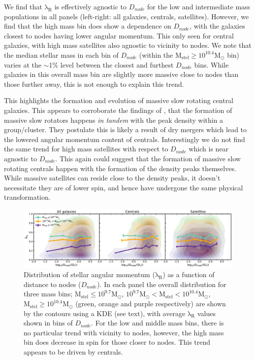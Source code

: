 We find that $\mathrm{\lambda_R}$ is effectively agnostic to $D_{node}$ for the low and intermediate mass populations in all panels (left-right: all galaxies, centrals, satellites). However, we find that the high mass bin does show a dependence on $D_{node}$, with the galaxies closest to nodes having lower angular momentum. This only seen for central galaxies, with high mass satellites also agnostic to vicinity to nodes. We note that the median stellar mass in each bin of $D_{node}$ (within the $\mathrm{M_{stel} \geq 10^{10.4}M_{\odot}}$ bin) varies at the $\sim$1\% level between the closest and furthest $D_{node}$ bins. While galaxies in this overall mass bin are slightly more massive close to nodes than those further away, this is not enough to explain this trend.

This highlights the formation and evolution of massive slow rotating central galaxies. This appears to corroborate the findings of \citet{graham2019}, that the formation of massive slow rotators happens \textit{in tandem} with the peak density within a group/cluster. They postulate this is likely a result of dry mergers which lead to the lowered angular momentum content of centrals. Interestingly we do not find the same trend for high mass satellites with respect to $D_{node}$ which is near agnostic to $D_{node}$. This again could suggest that the formation of massive slow rotating centrals happen with the formation of the density peaks themselves. While massive satellites can reside close to the density peaks, it doesn't necessitate they are of lower spin, and hence have undergone the same physical transformation.

\begin{figure}
    \centering\includegraphics[width=\linewidth]{thesis/latex/cw_spin/lambdaR_dnode_mass_split_3sigma.pdf}
    \caption{Distribution of stellar angular momentum ($\mathrm{\lambda_R}$) as a function of distance to nodes ($D_{node}$). In each panel the overall distribution for three mass bins; $\mathrm{M_{stel} \leq 10^{9.7} M_{\odot}}$, $\mathrm{10^{9.7}M_{\odot} < M_{stel} < 10^{10.4}M_{\odot}}$, $\mathrm{M_{stel} \geq 10^{10.4}M_{\odot}}$ (green, orange and purple respectively) are shown by the contours using a KDE (see text), with average $\mathrm{\lambda_R}$ values shown in bins of $D_{node}$. For the low and middle mass bins, there is no particular trend with vicinity to nodes, however, the high mass bin does decrease in spin for those closer to nodes. This trend appears to be driven by centrals.}
\label{fig:lambdaR_dnode}
\end{figure} 

